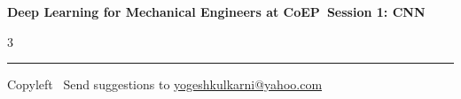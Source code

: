 \documentclass[8pt,landscape]{article}
\begin{document}
\footnotesize

\begin{center}
\Large{\textbf{Deep Learning for Mechanical Engineers at CoEP\ Session 1: CNN}}
\end{center}

\begin{multicols}{3}

\end{multicols}

\rule{\linewidth}{0.25pt}
\scriptsize
Copyleft \textcopyleft\  Send suggestions to
\href{http://www.yogeshkulkarni.com}{yogeshkulkarni@yahoo.com}
\end{document}
